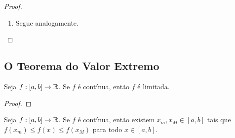 \begin{proof}
\begin{enumerate}[leftmargin=*, align=left, label=\textbf{(\alph*)}]
\begin{align*}
                    &\Rightarrow |f^{-1}(y) - f^{-1}(b)| < \epsilon,
                \end{align*}
            isto é, $f^{-1}$ é contínua em $b$. Por fim, suponha que $a$ é a extremidade esquerda do intervalo $I$. Se $y \in f(I)$, então $y=f(c)$ para algum $c \in I$; logo, $a \leq c$, e então $b = f(a) \leq y$. Seja $\epsilon \in \R_{>0}$ tal que $a+\epsilon \in I$. Como $a < a+\epsilon$, temos $f(a) < f(a+\epsilon)$. Pois tome $\delta := f(a+\epsilon)-f(a)$. Logo, para todo $y \in f(I)$, se $|y-b|<\delta$, então
                \begin{align*}
                    b - \delta < y < b + \delta &\Rightarrow b \leq y < b + \delta \\
                    &\Rightarrow f(a) \leq y < f(a+\epsilon) \\
                    &\Rightarrow f^{-1}(f(a)) \leq f^{-1}(y) < f^{-1}(f(a+\epsilon)) \\
                    &\Rightarrow a \leq f^{-1}(y) < a + \epsilon \\
                    &\Rightarrow f^{-1}(b) \leq f^{-1}(y) < f^{-1}(b) + \epsilon \\
                    &\Rightarrow |f^{-1}(y) - f^{-1}(b)| < \epsilon,
                \end{align*}
            isto é, $f^{-1}$ é contínua em $b$. \blackproof
        \item Segue analogamente. \blackproof
        \end{enumerate}
\end{proof}

\subsection{O Teorema do Valor Extremo}

\begin{theorem}[Limitação] \label{teo.calc1:limitacao}
    Seja $f : [a,b] \to \mathbb{R}$. Se $f$ é contínua, então $f$ é limitada.
\end{theorem}

\begin{proof}
    \blackproof
\end{proof}

\begin{theorem} \label{teo.calc1:valor_extremo_weierstrass}
    Seja $f: [a,b] \to \mathbb{R}$. Se $f$ é contínua, então existem $x_m, x_M \in [a,b]$ tais que $f(x_m) \leq f(x) \leq f(x_M)$ para todo $x \in [a,b]$.
\end{theorem}

